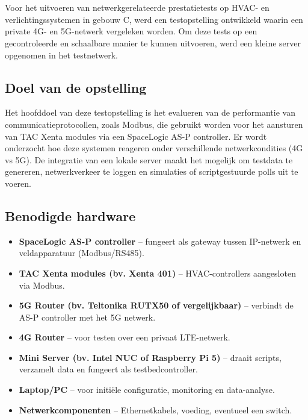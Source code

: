 \chapter{}%
\label{ch:uitgebreide-opstelling}

Voor het uitvoeren van netwerkgerelateerde prestatietests op HVAC- en verlichtingssystemen in gebouw C, werd een testopstelling ontwikkeld waarin een private 4G- en 5G-netwerk vergeleken worden. Om deze tests op een gecontroleerde en schaalbare manier te kunnen uitvoeren, werd een kleine server opgenomen in het testnetwerk.

\section*{Doel van de opstelling}

Het hoofddoel van deze testopstelling is het evalueren van de performantie van communicatieprotocollen, zoals Modbus, die gebruikt worden voor het aansturen van TAC Xenta modules via een SpaceLogic AS-P controller. Er wordt onderzocht hoe deze systemen reageren onder verschillende netwerkcondities (4G vs 5G). De integratie van een lokale server maakt het mogelijk om testdata te genereren, netwerkverkeer te loggen en simulaties of scriptgestuurde polls uit te voeren.

\section*{Benodigde hardware}

\begin{itemize}
    \item \textbf{SpaceLogic AS-P controller} – fungeert als gateway tussen IP-netwerk en veldapparatuur (Modbus/RS485).
    \item \textbf{TAC Xenta modules (bv. Xenta 401)} – HVAC-controllers aangesloten via Modbus.
    \item \textbf{5G Router (bv. Teltonika RUTX50 of vergelijkbaar)} – verbindt de AS-P controller met het 5G netwerk.
    \item \textbf{4G Router} – voor testen over een privaat LTE-netwerk.
    \item \textbf{Mini Server (bv. Intel NUC of Raspberry Pi 5)} – draait scripts, verzamelt data en fungeert als testbedcontroller.
    \item \textbf{Laptop/PC} – voor initiële configuratie, monitoring en data-analyse.
    \item \textbf{Netwerkcomponenten} – Ethernetkabels, voeding, eventueel een switch.
\end{itemize}

